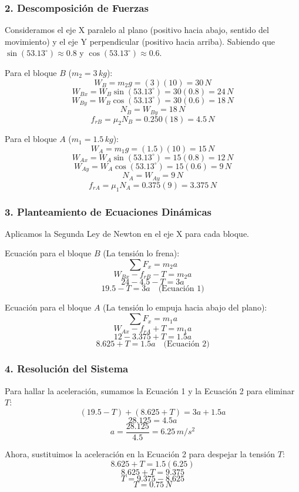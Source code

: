 \documentclass[12pt, a4paper]{article}
\begin{document}
\subsubsection*{2. Descomposición de Fuerzas}
Consideramos el eje X paralelo al plano (positivo hacia abajo, sentido del movimiento) y el eje Y perpendicular (positivo hacia arriba).
Sabiendo que $\sin(53.13^\circ) \approx 0.8$ y $\cos(53.13^\circ) \approx 0.6$.

Para el bloque $B$ ($m_2 = 3 \, \si{kg}$):
$$ W_B = m_2 g = (3)(10) = 30 \, \si{N} $$
$$ W_{Bx} = W_B \sin(53.13^\circ) = 30(0.8) = 24 \, \si{N} $$
$$ W_{By} = W_B \cos(53.13^\circ) = 30(0.6) = 18 \, \si{N} $$
$$ N_B = W_{By} = 18 \, \si{N} $$
$$ f_{rB} = \mu_2 N_B = 0.250(18) = 4.5 \, \si{N} $$

Para el bloque $A$ ($m_1 = 1.5 \, \si{kg}$):
$$ W_A = m_1 g = (1.5)(10) = 15 \, \si{N} $$
$$ W_{Ax} = W_A \sin(53.13^\circ) = 15(0.8) = 12 \, \si{N} $$
$$ W_{Ay} = W_A \cos(53.13^\circ) = 15(0.6) = 9 \, \si{N} $$
$$ N_A = W_{Ay} = 9 \, \si{N} $$
$$ f_{rA} = \mu_1 N_A = 0.375(9) = 3.375 \, \si{N} $$

\subsubsection*{3. Planteamiento de Ecuaciones Dinámicas}
Aplicamos la Segunda Ley de Newton en el eje X para cada bloque.

Ecuación para el bloque $B$ (La tensión lo frena):
$$ \sum F_x = m_2 a $$
$$ W_{Bx} - f_{rB} - T = m_2 a $$
$$ 24 - 4.5 - T = 3a $$
$$ 19.5 - T = 3a \quad \text{(Ecuación 1)} $$

Ecuación para el bloque $A$ (La tensión lo empuja hacia abajo del plano):
$$ \sum F_x = m_1 a $$
$$ W_{Ax} - f_{rA} + T = m_1 a $$
$$ 12 - 3.375 + T = 1.5a $$
$$ 8.625 + T = 1.5a \quad \text{(Ecuación 2)} $$

\subsubsection*{4. Resolución del Sistema}
Para hallar la aceleración, sumamos la Ecuación 1 y la Ecuación 2 para eliminar $T$:
$$ (19.5 - T) + (8.625 + T) = 3a + 1.5a $$
$$ 28.125 = 4.5a $$
$$ a = \frac{28.125}{4.5} = 6.25 \, \si{m/s^2} $$

Ahora, sustituimos la aceleración en la Ecuación 2 para despejar la tensión $T$:
$$ 8.625 + T = 1.5(6.25) $$
$$ 8.625 + T = 9.375 $$
$$ T = 9.375 - 8.625 $$
$$ T = 0.75 \, \si{N} $$
\end{document}
